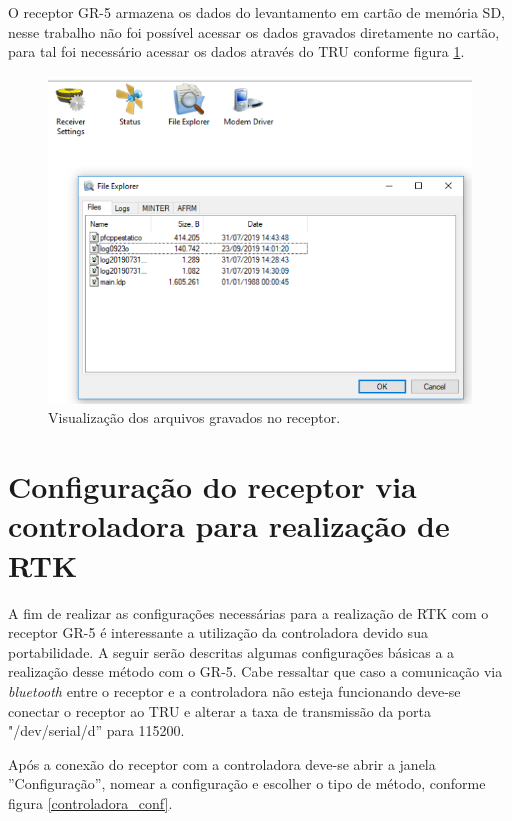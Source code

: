 O receptor GR-5 armazena os dados do levantamento em cartão de memória SD, nesse trabalho não foi possível acessar os dados gravados diretamente no cartão, para tal foi necessário acessar os dados através do TRU conforme figura \ref{TRU_dados}.

\begin{figure}[H]
\centering
\includegraphics[scale=0.4]{pfc_pdf_files/img/TRU_17_dados.png} %
\caption{Visualização dos arquivos gravados no receptor.}
\label{TRU_dados}
\end{figure}

\section{Configuração do receptor via controladora para realização de RTK}

A fim de realizar as configurações necessárias para a realização de RTK com o receptor GR-5 é interessante a utilização da controladora devido sua portabilidade. A seguir serão descritas algumas configurações básicas a a realização desse método com o GR-5. Cabe ressaltar que caso a comunicação via \textit{bluetooth} entre o receptor e a controladora não esteja funcionando deve-se conectar o receptor ao TRU e alterar a taxa de transmissão da porta "/dev/serial/d'' para 115200.

Após a conexão do receptor com a controladora deve-se abrir a janela ''Configuração'', nomear a configuração e escolher o tipo de método, conforme figura \ref{controladora_conf}.

